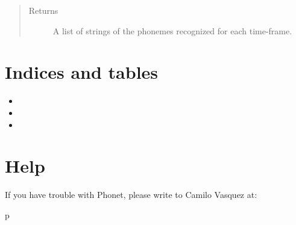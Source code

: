 \documentclass[letterpaper,10pt,english]{sphinxmanual}
\begin{document}
\begin{fulllineitems}
\begin{fulllineitems}
\begin{quote}
\begin{description}
\item[{Returns}] \leavevmode
A list of strings of the phonemes recognized for each time-frame.

\end{description}\end{quote}

\end{fulllineitems}


\end{fulllineitems}



\chapter{Indices and tables}
\label{\detokenize{index:indices-and-tables}}\begin{itemize}
\item {} 

\item {} 

\item {} 

\end{itemize}


\chapter{Help}
\label{\detokenize{index:help}}
If you have trouble with Phonet, please write to Camilo Vasquez at: 


\renewcommand{\indexname}{Python Module Index}
\begin{sphinxtheindex}
\def\bigletter#1{{\Large\sffamily#1}\nopagebreak\vspace{1mm}}
\bigletter{p}
\item {}
\end{sphinxtheindex}

\renewcommand{\indexname}{Index}
\printindex
\end{document}
